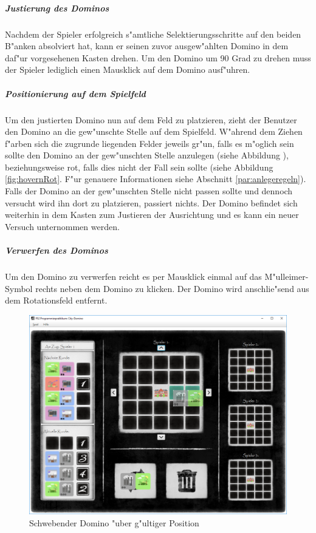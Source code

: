 \subparagraph{Justierung des Dominos}
Nachdem der Spieler erfolgreich s"amtliche Selektierungsschritte auf den beiden B"anken absolviert hat, kann er seinen zuvor ausgew"ahlten Domino in dem daf"ur vorgesehenen Kasten drehen. Um den Domino um 90 Grad zu drehen muss der Spieler lediglich einen Mausklick auf dem Domino ausf"uhren. 

\subparagraph{Positionierung auf dem Spielfeld}
Um den justierten Domino nun auf dem Feld zu platzieren, zieht der Benutzer den Domino an die gew"unschte Stelle auf dem Spielfeld. W"ahrend dem Ziehen f"arben sich die zugrunde liegenden Felder jeweils gr"un, falls es m"oglich sein sollte den Domino an der gew"unschten Stelle anzulegen (siehe Abbildung \pageref{fig:hovernGruen}), beziehungsweise rot, falls dies nicht der Fall sein sollte (siehe Abbildung \ref{fig:hovernRot}. F"ur genauere Informationen siehe Abschnitt \ref{par:anlegeregeln}). Falls der Domino an der gew"unschten Stelle nicht passen sollte und dennoch versucht wird ihn dort zu platzieren, passiert nichts. Der Domino befindet sich weiterhin in dem Kasten zum Justieren der Ausrichtung und es kann ein neuer Versuch unternommen werden. 

\subparagraph{Verwerfen des Dominos}
Um den Domino zu verwerfen reicht es per Mausklick einmal auf das M"ulleimer-Symbol rechts neben dem Domino zu klicken. Der Domino wird anschlie"send aus dem Rotationsfeld entfernt. 

\begin{figure}
	\centering
	\includegraphics{screenshots/screenshot_HovernGruen}
	\caption{Schwebender Domino "uber g"ultiger Position}
	\label{fig:hovernGruen}
\end{figure}

